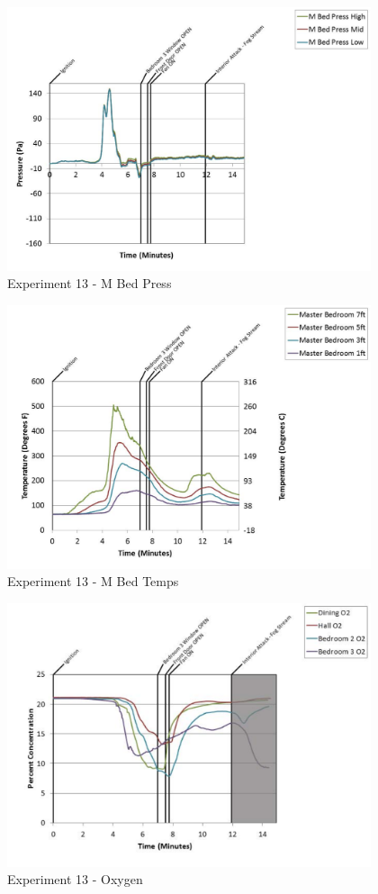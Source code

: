 \documentclass{article}
\begin{document}
\begin{appendices}
	\begin{figure}[h!]
		\centering
		\includegraphics[height=3.05in]{0_Images/Results_Charts/Exp_13_Charts/MBedPress.pdf}
		\caption{Experiment 13 - M Bed Press}
	\end{figure}
 
	\clearpage

	\begin{figure}[h!]
		\centering
		\includegraphics[height=3.05in]{0_Images/Results_Charts/Exp_13_Charts/MBedTemps.pdf}
		\caption{Experiment 13 - M Bed Temps}
	\end{figure}
 

	\begin{figure}[h!]
		\centering
		\includegraphics[height=3.05in]{0_Images/Results_Charts/Exp_13_Charts/Oxygen.pdf}
		\caption{Experiment 13 - Oxygen}
	\end{figure}
 

\end{appendices}
\end{document}
